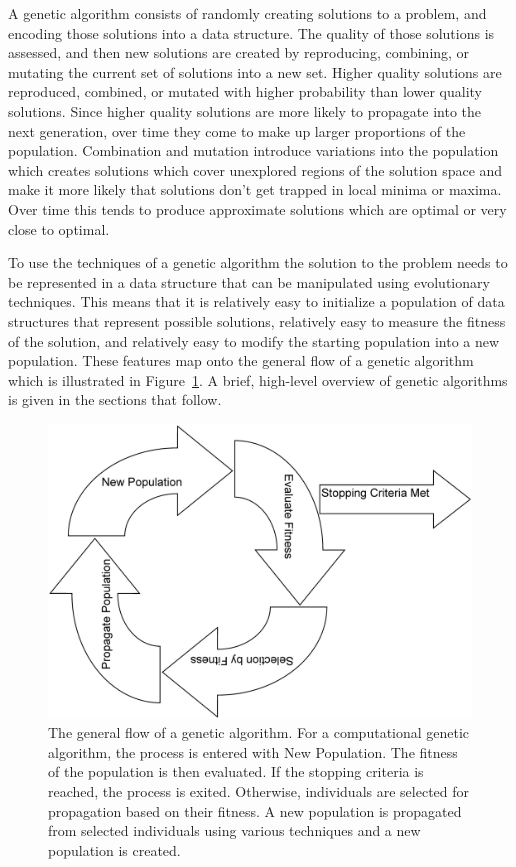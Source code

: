 A genetic algorithm consists of randomly creating solutions to a problem, and
encoding those solutions into a data structure. The quality of those solutions
is assessed, and then new solutions are created by reproducing, combining, or
mutating the current set of solutions into a new set. Higher quality solutions
are reproduced, combined, or mutated with higher probability than lower quality
solutions. Since higher quality solutions are more likely to propagate into the
next generation, over time they come to make up larger proportions of the
population. Combination and mutation introduce variations into the population
which creates solutions which cover unexplored regions of the solution space and
make it more likely that solutions don't get trapped in local minima or maxima.
Over time this tends to produce approximate solutions which are optimal or very
close to optimal.

To use the techniques of a genetic algorithm the solution to the problem needs
to be represented in a data structure that can be manipulated using evolutionary
techniques. This means that it is relatively easy to initialize a population of
data structures that represent possible solutions, relatively easy to measure
the fitness of the solution, and relatively easy to modify the starting
population into a new population. These features map onto the general flow of a
genetic algorithm which is illustrated in Figure~\ref{figure-gaflow}. A brief,
high-level overview of genetic algorithms is given in the sections that follow.

\begin{figure}[htp]
\centerline{\includegraphics[width=1.0\columnwidth]{Figures/GAFlow.png}}
\caption[Genetic Algorithm Flow]{The general flow of a genetic algorithm. For a
computational genetic algorithm, the process is entered with New Population.
The fitness of the population is then evaluated. If the stopping criteria is
reached, the process is exited. Otherwise, individuals are selected for
propagation based on their fitness. A new population is propagated from
selected individuals using various techniques and a new population is created.}
\label{figure-gaflow}
\end{figure}

